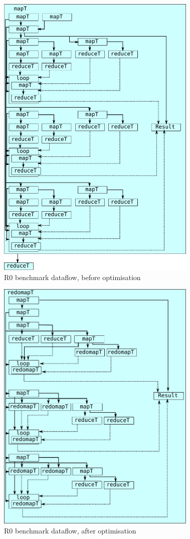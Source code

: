 \begin{figure}
\begin{center}
\includegraphics[width=9.6cm]{img/CalibLexiFi-unfused.pdf}
\end{center}
\caption{R0 benchmark dataflow, before optimisation}
\label{fig:r2-dataflow-unfused}
\end{figure}

\begin{figure}
\begin{center}
\includegraphics[width=9.6cm]{img/CalibLexiFi-fused.pdf}
\end{center}
\caption{R0 benchmark dataflow, after optimisation}
\label{fig:r2-dataflow-fused}
\end{figure}


